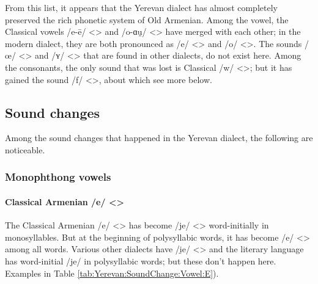 From this list, it appears that the Yerevan dialect has almost completely preserved the rich phonetic system of Old Armenian. Among the vowel, the Classical vowels /e-ē/ <> and /o-ɑu̯/ <> have merged with each other; in the modern dialect, they are both pronounced as /e/ <> and /o/ <>. The sounds /œ/ <> and /ʏ/ <> that are found in other dialects, do not exist here. Among the consonants, the only sound that was lost is Classical /w/ <>; but it has gained the sound /f/ <>, about which see more below.

\subsection{Sound changes}





Among the sound changes that happened in the Yerevan dialect, the following are noticeable. 


\subsubsection{Monophthong vowels}
\paragraph{Classical Armenian /e/ <>}

The Classical Armenian /e/ <> has become /je/ <> word-initially in monosyllables. But at the beginning of polysyllabic words, it has become /e/ <> among all words. Various other dialects have /i̯e/ <> and the literary language has word-initial /je/ in polysyllabic words; but these don't happen here. Examples in Table \ref{tab:Yerevan:SoundChange:Vowel:E}). 

